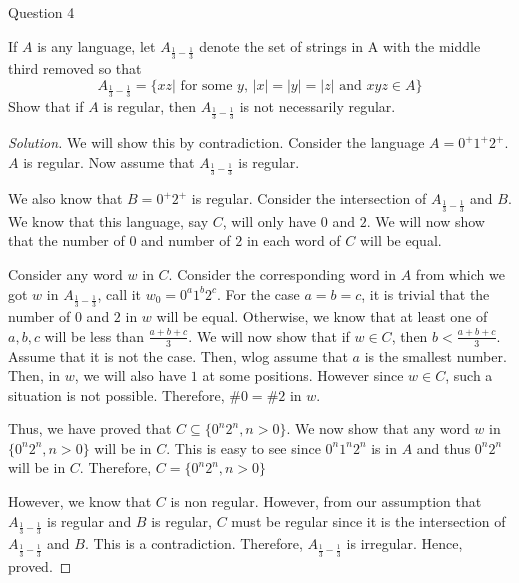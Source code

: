 \begin{solution}{Question 4}\label{ques:4}
    \begin{question}
    If $A$ is any language, let $A_{\frac{1}{3} -\frac{1}{3}}$ denote the set of strings in A with the middle third removed so that
    \begin{equation}
        A_{\frac{1}{3} -\frac{1}{3}} = \{xz | \text{ for some $y$, }|x| = |y| = |z| \text{ and } xyz \in A\}
    \end{equation}
    Show that if $A$ is regular, then $A_{\frac{1}{3} -\frac{1}{3}}$ is not necessarily regular.
    \end{question}
    \tcblower{}
    \begin{proof}[Solution]
      We will show this by contradiction. Consider the language $A = 0^+1^+2^+$. $A$ is regular. Now assume that $A_{\frac{1}{3}-\frac{1}{3}}$ is regular.\par
      We also know that $B = 0^+2^+$ is regular. Consider the intersection of $A_{\frac{1}{3}-\frac{1}{3}}$ and $B$. We know that this language, say $C$, will only have $0$ and $2$. We will now show that the number of $0$ and number of $2$ in each word of $C$ will be equal.\par
      Consider any word $w$ in $C$. Consider the corresponding word in $A$ from which we got $w$ in $A_{\frac{1}{3}-\frac{1}{3}}$, call it $w_0 = 0^a1^b2^c$. For the case $a=b=c$, it is trivial that the number of $0$ and $2$ in $w$ will be equal. Otherwise, we know that at least one of $a, b, c$ will be less than $\frac{a+b+c}{3}$. We will now show that if $w\in C$, then $b < \frac{a+b+c}{3}$. Assume that it is not the case. Then, wlog assume that $a$ is the smallest number. Then, in $w$, we will also have $1$ at some positions. However since $w\in C$, such a situation is not possible. Therefore, $\#0=\#2$ in $w$.\par
      Thus, we have proved that $C \subseteq \{0^n2^n, n > 0\}$. We now show that any word $w$ in $\{0^n2^n, n > 0\}$ will be in $C$. This is easy to see since $0^n1^n2^n$ is in $A$ and thus $0^n2^n$ will be in $C$. Therefore, $C = \{0^n2^n, n > 0\}$\par
      However, we know that $C$ is non regular. However, from our assumption that $A_{\frac{1}{3}-\frac{1}{3}}$ is regular and $B$ is regular, $C$ must be regular since it is the intersection of $A_{\frac{1}{3}-\frac{1}{3}}$ and $B$. This is a contradiction. Therefore, $A_{\frac{1}{3}-\frac{1}{3}}$ is irregular. Hence, proved.
    \end{proof}
\end{solution}
